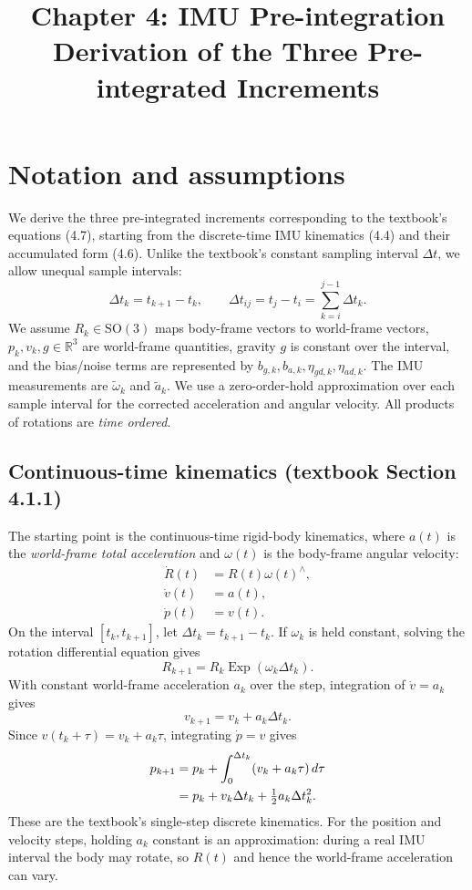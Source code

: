 \documentclass[11pt,a4paper]{article}
\title{Chapter 4: IMU Pre-integration\\\large Derivation of the Three Pre-integrated Increments}
\author{}
\date{}
\newcommand{\Exp}{\operatorname{Exp}}
\newcommand{\SO}{\mathrm{SO}}
\newcommand{\R}{\mathbb{R}}
\begin{document}
\maketitle
\tableofcontents

\section{Notation and assumptions}
We derive the three pre-integrated increments corresponding to the textbook's equations (4.7), starting from the discrete-time IMU kinematics (4.4) and their accumulated form (4.6). Unlike the textbook's constant sampling interval $\Delta t$, we allow unequal sample intervals:
\begin{equation}
\boxed{\Delta t_k=t_{k+1}-t_k,\qquad \Delta t_{ij}=t_j-t_i=\sum_{k=i}^{j-1}\Delta t_k.}
\end{equation}
We assume $R_k\in\SO(3)$ maps body-frame vectors to world-frame vectors, $p_k,v_k,g\in\R^3$ are world-frame quantities, gravity $g$ is constant over the interval, and the bias/noise terms are represented by $b_{g,k},b_{a,k},\eta_{gd,k},\eta_{ad,k}$. The IMU measurements are $\tilde\omega_k$ and $\tilde a_k$. We use a zero-order-hold approximation over each sample interval for the corrected acceleration and angular velocity. All products of rotations are \emph{time ordered}.


\subsection{Continuous-time kinematics (textbook Section 4.1.1)}
The starting point is the continuous-time rigid-body kinematics,
where $a(t)$ is the \emph{world-frame total acceleration} and
$\omega(t)$ is the body-frame angular velocity:
\begin{subequations}\label{eq:continuous_kinematics}
\begin{align}
\dot R(t)&=R(t)\omega(t)^\wedge,\\
\dot v(t)&=a(t),\\
\dot p(t)&=v(t).
\end{align}
\end{subequations}
On the interval $[t_k,t_{k+1}]$, let $\Delta t_k=t_{k+1}-t_k$.
If $\omega_k$ is held constant, solving the rotation differential
 equation gives
\begin{equation}
R_{k+1}=R_k\Exp(\omega_k\Delta t_k).
\end{equation}
With constant world-frame acceleration $a_k$ over the step,
 integration of $\dot v=a_k$ gives
\begin{equation}
v_{k+1}=v_k+a_k\Delta t_k.
\end{equation}
Since $v(t_k+\tau)=v_k+a_k\tau$, integrating $\dot p=v$ gives
\begin{align}
p_{k+1}&=p_k+\int_0^{\Delta t_k}(v_k+a_k\tau)\,d\tau\notag\\
&=p_k+v_k\Delta t_k+\tfrac12a_k\Delta t_k^2.
\end{align}
These are the textbook's single-step discrete kinematics.
For the position and velocity steps, holding $a_k$ constant is an
approximation: during a real IMU interval the body may rotate, so
$R(t)$ and hence the world-frame acceleration can vary.
\end{document}

